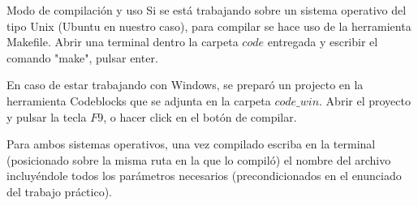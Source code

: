 \begin{section}{Modo de compilación y uso}
		Si se está trabajando sobre un sistema operativo del tipo Unix (Ubuntu en nuestro caso), para compilar se hace uso de la herramienta Makefile.			
		Abrir una terminal dentro la carpeta $code$ entregada y escribir el comando "make", pulsar enter.
		
		En caso de estar trabajando con Windows, se preparó un projecto en la herramienta Codeblocks que se adjunta en la carpeta $code\_win$.
		Abrir el proyecto y pulsar la tecla $F9$, o hacer click en el botón de compilar.
		
		Para ambos sistemas operativos, una vez compilado escriba en la terminal (posicionado sobre la misma ruta en la que lo compiló) el nombre del archivo incluyéndole todos los parámetros necesarios (precondicionados en el enunciado del trabajo práctico).
\end{section}